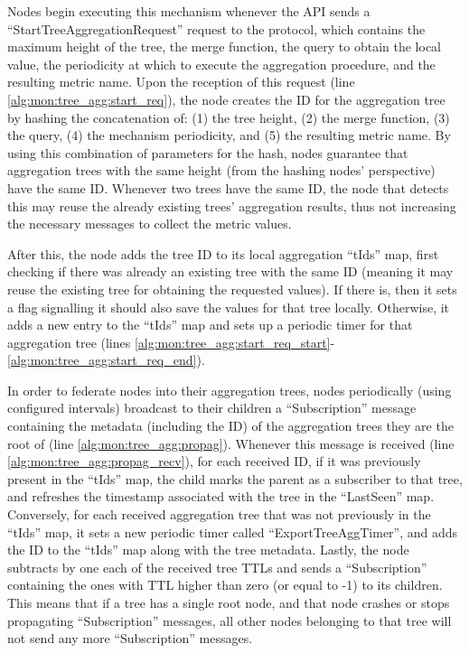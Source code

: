 

Nodes begin executing this mechanism whenever the API sends a ``StartTreeAggregationRequest'' request to the protocol, which contains the maximum height of the tree, the merge function, the query to obtain the local value, the periodicity at which to execute the aggregation procedure, and the resulting metric name. Upon the reception of this request (line \ref{alg:mon:tree_agg:start_req}), the node creates the ID for the aggregation tree by hashing the concatenation of: (1) the tree height, (2) the merge function, (3) the query, (4) the mechanism periodicity, and (5) the resulting metric name. By using this combination of parameters for the hash, nodes guarantee that aggregation trees with the same height (from the hashing nodes' perspective) have the same ID. Whenever two trees have the same ID, the node that detects this may reuse the already existing trees' aggregation results, thus not increasing the necessary messages to collect the metric values.
 
 After this, the node adds the tree ID to its local aggregation ``tIds'' map, first checking if there was already an existing tree with the same ID (meaning it may reuse the existing tree for obtaining the requested values). If there is, then it sets a flag signalling it should also save the values for that tree locally. Otherwise, it adds a new entry to the ``tIds'' map and sets up a periodic timer for that aggregation tree (lines \ref{alg:mon:tree_agg:start_req_start}-\ref{alg:mon:tree_agg:start_req_end}).

In order to federate nodes into their aggregation trees, nodes periodically (using configured intervals) broadcast to their children a ``Subscription'' message containing the metadata (including the ID) of the aggregation trees they are the root of (line \ref{alg:mon:tree_agg:propag}). Whenever this message is received (line \ref{alg:mon:tree_agg:propag_recv}), for each received ID, if it was previously present in the ``tIds'' map, the child marks the parent as a subscriber to that tree, and refreshes the timestamp associated with the tree in the ``LastSeen'' map. Conversely, for each received aggregation tree that was not previously in the ``tIds'' map, it sets a new periodic timer called ``ExportTreeAggTimer'', and adds the ID to the ``tIds'' map along with the tree metadata. Lastly, the node subtracts by one each of the received tree TTLs and sends a ``Subscription'' containing the ones with TTL higher than zero (or equal to -1) to its children. This means that if a tree has a single root node, and that node crashes or stops propagating ``Subscription'' messages, all other nodes belonging to that tree will not send any more ``Subscription'' messages.

